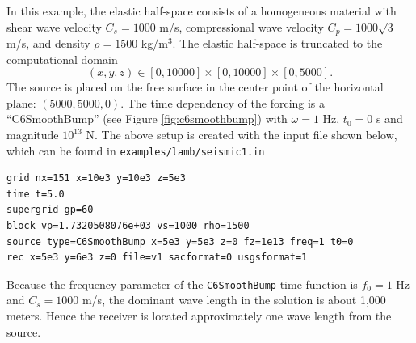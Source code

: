\documentclass[11pt]{report}
\begin{document}
In this example, the elastic half-space consists of a homogeneous material with shear wave
velocity $C_s=1000$ m/s, compressional wave velocity $C_p=1000\sqrt{3}$ m/s, and density $\rho=1500$
kg/m$^3$. The elastic half-space is truncated to the computational domain
\[
(x,y,z) \in [0,10000] \times [0,10000]\times[0,5000].
\]
The source is placed on the free surface in the center point of the horizontal plane:
$(5000,5000,0)$. The time dependency of the forcing is a ``C6SmoothBump'' (see Figure
\ref{fig:c6smoothbump}) with $\omega=1$ Hz, $t_0=0$ s and magnitude $10^{13}$ N. The above setup is
created with the input file shown below, which can be found in {\tt examples/lamb/seismic1.in}
\begin{verbatim}
grid nx=151 x=10e3 y=10e3 z=5e3
time t=5.0
supergrid gp=60
block vp=1.7320508076e+03 vs=1000 rho=1500
source type=C6SmoothBump x=5e3 y=5e3 z=0 fz=1e13 freq=1 t0=0
rec x=5e3 y=6e3 z=0 file=v1 sacformat=0 usgsformat=1
\end{verbatim}
Because the frequency parameter of the {\tt C6SmoothBump} time function is $f_0=1$ Hz and $C_s=1000$
m/s, the dominant wave length in the solution is about 1,000 meters. Hence the receiver is located
approximately one wave length from the source.
\end{document}
